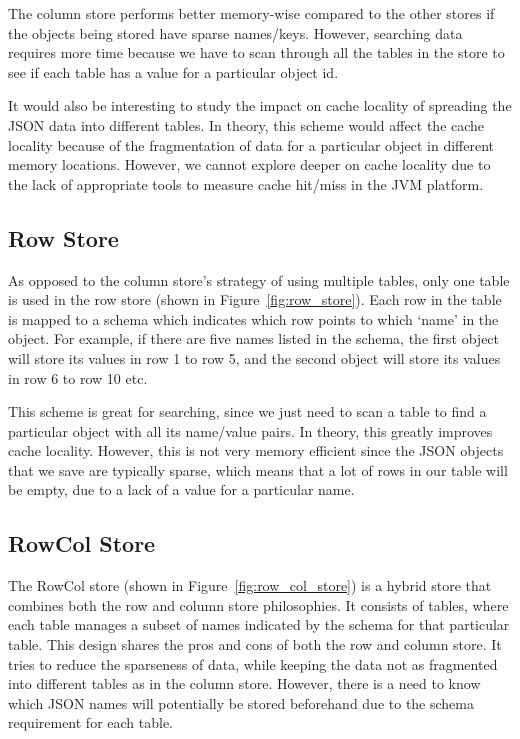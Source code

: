 \documentclass[11pt,journal,compsoc]{IEEEtran}
\begin{document}
The column store performs better memory-wise compared to the other stores if the objects being stored have sparse names/keys. However, searching data requires more time because we have to scan through all the tables in the store to see if each table has a value for a particular object id.

It would also be interesting to study the impact on cache locality of spreading the JSON data into different tables. In theory, this scheme would affect the cache locality because of the fragmentation of data for a particular object in different memory locations. However, we cannot explore deeper on cache locality due to the lack of appropriate tools to measure cache hit/miss in the JVM platform.

\subsection{Row Store}
As opposed to the column store’s strategy of using multiple tables, only one table is used in the row store (shown in Figure~\ref{fig:row_store}). Each row in the table is mapped to a schema which indicates which row points to which ‘name’ in the object. For example, if there are five names listed in the schema, the first object will store its values in row 1 to row 5, and the second object will store its values in row 6 to row 10 etc.

This scheme is great for searching, since we just need to scan a table to find a particular object with all its name/value pairs. In theory, this greatly improves cache locality. However, this is not very memory efficient since the JSON objects that we save are typically sparse, which means that a lot of rows in our table will be empty, due to a lack of a value for a particular name.

\subsection{RowCol Store}

The RowCol store (shown in Figure~\ref{fig:row_col_store}) is a hybrid store that combines both the row and column store philosophies. It consists of tables, where each table manages a subset of names indicated by the schema for that particular table. This design shares the pros and cons of both the row and column store. It tries to reduce the sparseness of data, while keeping the data not as fragmented into different tables as in the column store. However, there is a need to know which JSON names will potentially be stored beforehand due to the schema requirement for each table.
\end{document}
